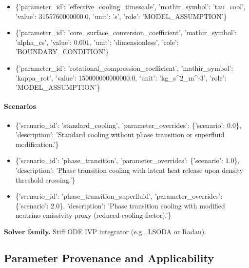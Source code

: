 \documentclass[11pt]{article}
\begin{document}
\begin{itemize}
\item \{'parameter\_\allowbreak{}id': 'effective\_\allowbreak{}cooling\_\allowbreak{}timescale', 'mathir\_\allowbreak{}symbol': 'tau\_\allowbreak{}cool', 'value': 3155760000000.0, 'unit': 's', 'role': 'MODEL\_\allowbreak{}ASSUMPTION'\}
\item \{'parameter\_\allowbreak{}id': 'core\_\allowbreak{}surface\_\allowbreak{}conversion\_\allowbreak{}coefficient', 'mathir\_\allowbreak{}symbol': 'alpha\_\allowbreak{}cs', 'value': 0.001, 'unit': 'dimensionless', 'role': 'BOUNDARY\_\allowbreak{}CONDITION'\}
\item \{'parameter\_\allowbreak{}id': 'rotational\_\allowbreak{}compression\_\allowbreak{}coefficient', 'mathir\_\allowbreak{}symbol': 'kappa\_\allowbreak{}rot', 'value': 150000000000000.0, 'unit': 'kg\_\allowbreak{}s\textasciicircum{}2\_\allowbreak{}m\textasciicircum{}-3', 'role': 'MODEL\_\allowbreak{}ASSUMPTION'\}
\end{itemize}

\paragraph{Scenarios}
\begin{itemize}\raggedright
\item \{'scenario\_\allowbreak{}id': 'standard\_\allowbreak{}cooling', 'parameter\_\allowbreak{}overrides': \{'scenario': 0.0\}, 'description': 'Standard cooling without phase transition or superfluid modification.'\}
\item \{'scenario\_\allowbreak{}id': 'phase\_\allowbreak{}transition', 'parameter\_\allowbreak{}overrides': \{'scenario': 1.0\}, 'description': 'Phase transition cooling with latent heat release upon density threshold crossing.'\}
\item \{'scenario\_\allowbreak{}id': 'phase\_\allowbreak{}transition\_\allowbreak{}superfluid', 'parameter\_\allowbreak{}overrides': \{'scenario': 2.0\}, 'description': 'Phase transition cooling with modified neutrino emissivity proxy (reduced cooling factor).'\}
\end{itemize}

\noindent\textbf{Solver family.} Stiff ODE IVP integrator (e.g., LSODA or Radau).

\subsection{Parameter Provenance and Applicability}
\end{document}
